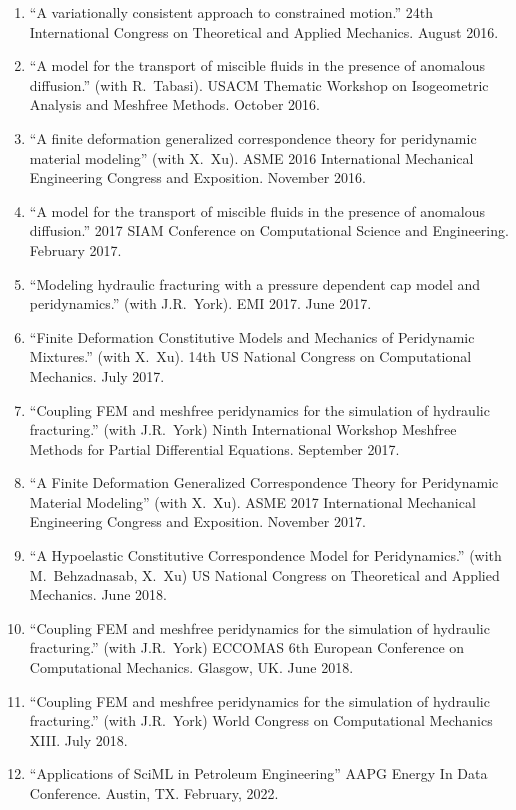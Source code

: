 \begin{enumerate}[resume]
    \item ``A variationally consistent approach to constrained motion.'' 24th International Congress on Theoretical and Applied Mechanics.  August 2016.
    \item ``A model for the transport of miscible fluids in the presence of anomalous diffusion.'' (with R.\ Tabasi). USACM Thematic Workshop on Isogeometric Analysis and Meshfree Methods.  October 2016.
    \item ``A finite deformation generalized correspondence theory for peridynamic material modeling'' (with X.\ Xu). ASME 2016 International Mechanical Engineering Congress and Exposition. November 2016.
    \item ``A model for the transport of miscible fluids in the presence of anomalous diffusion.'' 2017 SIAM Conference on Computational Science and Engineering.  February 2017.
    \item ``Modeling hydraulic fracturing with a pressure dependent cap model and peridynamics.'' (with J.R.\ York). EMI 2017. June 2017.
    \item ``Finite Deformation Constitutive Models and Mechanics of Peridynamic Mixtures.'' (with X.\ Xu). 14th US National Congress on Computational Mechanics. July 2017.
    \item ``Coupling FEM and meshfree peridynamics for the simulation of hydraulic fracturing.'' (with J.R.\ York) Ninth International Workshop Meshfree Methods for Partial Differential Equations. September 2017.
    \item ``A Finite Deformation Generalized Correspondence Theory for Peridynamic Material Modeling'' (with X.\ Xu). ASME 2017 International Mechanical Engineering Congress and Exposition. November 2017.
    \item ``A Hypoelastic Constitutive Correspondence Model for Peridynamics.'' (with M.\ Behzadnasab, X.\ Xu) US National Congress on Theoretical and Applied Mechanics. June 2018.
    \item ``Coupling FEM and meshfree peridynamics for the simulation of hydraulic fracturing.'' (with J.R.\ York) ECCOMAS 6th European Conference on Computational Mechanics. Glasgow, UK. June 2018.
    \item ``Coupling FEM and meshfree peridynamics for the simulation of hydraulic fracturing.'' (with J.R.\ York) World Congress on Computational Mechanics XIII. July 2018.
    \item ``Applications of SciML in Petroleum Engineering''  AAPG Energy In Data Conference. Austin, TX.  February, 2022.

\end{enumerate}
